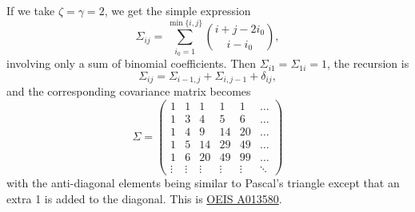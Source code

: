 \documentclass[10pt,twoside,a4paper]{amsart}
\begin{document}
\begin{ex}
    If we take $\zeta = \gamma = 2$, we get the simple expression 
    \begin{equation} \label{eq:Sigmaij2}
        \Sigma_{ij} = \sum_{i_0=1}^{\min\{i,j\}} 
        {i + j - 2i_0 \choose i - i_0},
    \end{equation}
    involving only a sum of binomial coefficients. Then $\Sigma_{i1} = \Sigma_{1i} = 1$,
    the recursion is 
    \[
        \Sigma_{ij} =  \Sigma_{i-1,j} + 
        \Sigma_{i,j-1} + \delta_{ij},
    \]
    and the corresponding covariance matrix becomes  
    \begin{equation}  \label{eq:pascal}
        \Sigma = \left( \begin{array}{cccccc} 
            1 & 1 & 1 & 1 & 1 & \ldots \\
            1 & 3 & 4 & 5 & 6 & \ldots \\
            1 & 4 & 9 & 14 & 20 & \ldots \\
            1 & 5 & 14 & 29 & 49 & \ldots \\
            1 & 6 & 20 & 49 & 99 & \ldots \\
            \vdots & \vdots & \vdots & \vdots & \vdots & \ddots
        \end{array}\right)
    \end{equation}
    with the anti-diagonal elements being similar to Pascal's triangle 
    except that an extra 1 is added to the diagonal. 
    This is \href{https://oeis.org/A013580}{OEIS A013580}. 
\end{ex}
\end{document}
